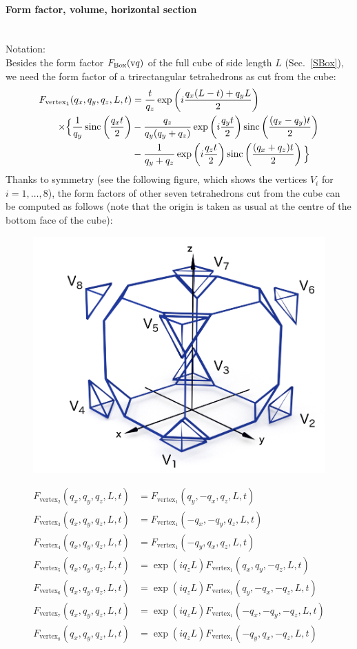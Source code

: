 \paragraph{Form factor, volume, horizontal section}\strut\\
Notation:\\
Besides the form factor $F_\text{Box}(\text{v}{q})$
of the full cube of side length $L$ (Sec.~\ref{SBox}),
we need the form factor of a trirectangular tetrahedrons
as cut from the cube:
\begin{align*}
F_{\text{vertex}_1}(q_x, q_y, q_z, L, t) &=\frac{t}{q_z}\exp\left( i\frac{q_x(L-t)+ q_y L}{2} \right) \\
\times \Big\{ \frac{1}{q_y} \operatorname{sinc}\left( \frac{q_x t}{2}\right)
&- \frac{q_z}{q_y(q_y + q_z)} \exp\left(i\frac{q_yt}{2}\right) \operatorname{sinc}\left( \frac{(q_x-q_y)t}{2}\right)\\
&- \frac{1}{q_y + q_z} \exp\left( i\frac{q_z t}{2} \right) \operatorname{sinc} \left( \frac{(q_x+q_z) t}{2} \right)  \Big\}
\end{align*}
Thanks to symmetry (see the following figure,
which shows the vertices $V_i$ for $i=1,\ldots,8$),
the form factors of other seven tetrahedrons cut from the cube
can be computed as follows
(note that the origin is taken as usual
at the centre of the bottom face of the cube):
\begin{figure}[H]
\begin{center}
\includegraphics[width=.5\textwidth]{fig/drawing/SketchTruncatedcube.png}
\end{center}
\end{figure}
\begin{align*}
F_{\text{vertex}_2}(q_x, q_y, q_z, L, t) &= F_{\text{vertex}_1}(q_y, -q_x, q_z, L, t) \\
F_{\text{vertex}_3}(q_x, q_y, q_z, L, t) &= F_{\text{vertex}_1}(-q_x, -q_y, q_z, L, t) \\
F_{\text{vertex}_4}(q_x, q_y, q_z, L, t) &= F_{\text{vertex}_1}(-q_y, q_x, q_z, L, t) \\
F_{\text{vertex}_5}(q_x, q_y, q_z, L, t) &= \exp(iq_zL)F_{\text{vertex}_1}(q_x, q_y, -q_z, L, t) \\
F_{\text{vertex}_6}(q_x, q_y, q_z, L, t) &= \exp(iq_zL)F_{\text{vertex}_1}(q_y, -q_x,- q_z, L, t) \\
F_{\text{vertex}_7}(q_x, q_y, q_z, L, t) &= \exp(iq_zL)F_{\text{vertex}_1}(-q_x, -q_y, -q_z, L, t) \\
F_{\text{vertex}_8}(q_x, q_y, q_z, L, t) &= \exp(iq_zL)F_{\text{vertex}_1}(-q_y, q_x, -q_z, L, t)
\end{align*}
